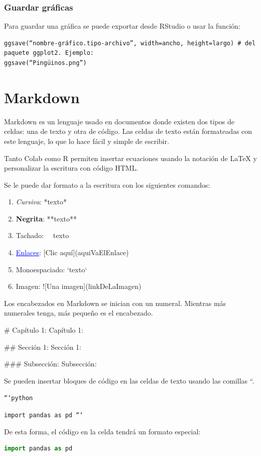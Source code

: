 \documentclass[a4paper, 12pt]{book}
\begin{document}
\subsection{Guardar gráficas}
Para guardar una gráfica se puede exportar desde RStudio o usar la función:
\begin{verbatim} 
ggsave(“nombre-gráfico.tipo-archivo”, width=ancho, height=largo) # del paquete ggplot2. Ejemplo:
ggsave(“Pingüinos.png”)
\end{verbatim}
%
\chapter{Markdown}
Markdown es un lenguaje usado en documentos donde existen dos tipos de celdas: una de texto y otra de código. Las celdas de texto están formateadas con este lenguaje, lo que lo hace fácil y simple de escribir.

Tanto Colab como R permiten insertar ecuaciones usando la notación de LaTeX y personalizar la escritura con código HTML.


Se le puede dar formato a la escritura con los siguientes comandos:
\begin{enumerate}
	\item \textit{Cursiva}: *texto*
	\item \textbf{Negrita}: **texto**
	\item Tachado: ~~texto~~
	\item \textcolor{blue}{\underline{Enlaces}}: [Clic aquí](aquiVaElEnlace)
	\item Monoespaciado: `texto`
	\item Imagen: ![Una imagen](linkDeLaImagen)
\end{enumerate}

Los encabezados en Markdown se inician con un numeral. Mientras más numerales tenga, más pequeño es el encabezado.

$\#$ Capítulo 1: {\LARGE Capítulo 1:}

$\#\#$ Sección 1: {\Large Sección 1:}

$\#\#\#$ Subsección: {\large Subsección:}

Se pueden insertar bloques de código en las celdas de texto usando las comillas ``.

\texttt{```python}
	
\texttt{import pandas as pd
	```}

De esta forma, el código en la celda tendrá un formato especial:
\begin{lstlisting}[language=Python]
import pandas as pd
\end{lstlisting}
\end{document}
